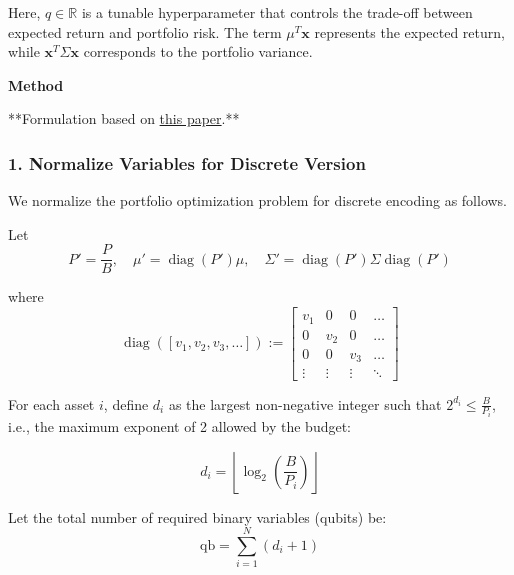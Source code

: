 Here, \( q \in \mathbb{R} \) is a tunable hyperparameter that controls the trade-off between expected return and portfolio risk. The term \( \mu^T \mathbf{x} \) represents the expected return, while \( \mathbf{x}^T \Sigma \mathbf{x} \) corresponds to the portfolio variance.




{\Huge\bfseries \hspace{2em}Method\par}
{}
\vspace{1.5em}

**Formulation based on \href{https://www.nature.com/articles/s41598-023-45392-w}{this paper}.**

\subsubsection*{1. Normalize Variables for Discrete Version}
{}

We normalize the portfolio optimization problem for discrete encoding as follows.

Let
\begin{equation}
    P' = \frac{P}{B}, \quad \mu' = \operatorname{diag}(P') \mu, \quad \Sigma' = \operatorname{diag}(P') \Sigma \operatorname{diag}(P')
\end{equation}


where
\[
\operatorname{diag}([v_1, v_2, v_3, \dots]) := 
\begin{bmatrix}
v_1 & 0 & 0 & \dots \\
0 & v_2 & 0 & \dots \\
0 & 0 & v_3 & \dots \\
\vdots & \vdots & \vdots & \ddots
\end{bmatrix}
\]

For each asset \( i \), define \( d_i \) as the largest non-negative integer such that \( 2^{d_i} \leq \frac{B}{P_i} \), i.e., the maximum exponent of 2 allowed by the budget:

\begin{equation}
    d_i = \left\lfloor \log_2 \left( \frac{B}{P_i} \right) \right\rfloor
\end{equation}

Let the total number of required binary variables (qubits) be:
\begin{equation}
    \text{qb} = \sum_{i=1}^N (d_i + 1)
\end{equation}

